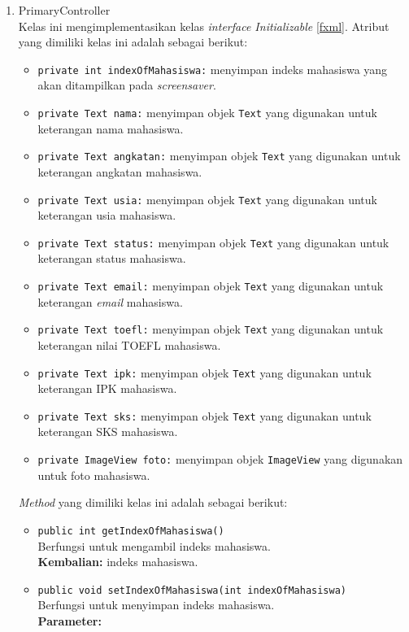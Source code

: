 \begin{enumerate}
\item{PrimaryController}\\
Kelas ini mengimplementasikan kelas \textit{interface Initializable} \ref{fxml}. Atribut yang dimiliki kelas ini adalah sebagai berikut:
\begin{itemize}
    \item \texttt{private int indexOfMahasiswa:} menyimpan indeks mahasiswa yang akan ditampilkan pada \textit{screensaver}.
    \item \texttt{private Text nama:} menyimpan objek \texttt{Text} yang digunakan untuk keterangan nama mahasiswa.
    \item \texttt{private Text angkatan:} menyimpan objek \texttt{Text} yang digunakan untuk keterangan angkatan mahasiswa.
    \item \texttt{private Text usia:} menyimpan objek \texttt{Text} yang digunakan untuk keterangan usia mahasiswa.
    \item \texttt{private Text status:} menyimpan objek \texttt{Text} yang digunakan untuk keterangan status mahasiswa.
    \item \texttt{private Text email:} menyimpan objek \texttt{Text} yang digunakan untuk keterangan \textit{email} mahasiswa.
    \item \texttt{private Text toefl:} menyimpan objek \texttt{Text} yang digunakan untuk keterangan nilai TOEFL mahasiswa.
    \item \texttt{private Text ipk:} menyimpan objek \texttt{Text} yang digunakan untuk keterangan IPK mahasiswa.
    \item \texttt{private Text sks:} menyimpan objek \texttt{Text} yang digunakan untuk keterangan SKS mahasiswa.
    \item \texttt{private ImageView foto:} menyimpan objek \texttt{ImageView} yang digunakan untuk foto mahasiswa.
\end{itemize}
\textit{Method} yang dimiliki kelas ini adalah sebagai berikut:
\begin{itemize}
    \item \texttt{public int getIndexOfMahasiswa()}\\
    Berfungsi untuk mengambil indeks mahasiswa.\\
	\textbf{Kembalian:} indeks mahasiswa.
    \item \texttt{public void setIndexOfMahasiswa(int indexOfMahasiswa)}\\
    Berfungsi untuk menyimpan indeks mahasiswa.\\
    \textbf{Parameter:}

\end{itemize}
\end{enumerate}
